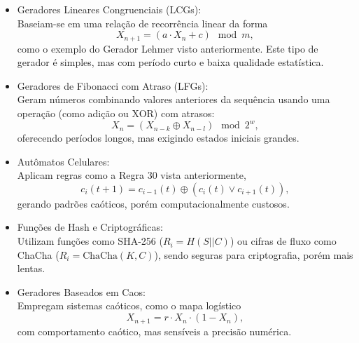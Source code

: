 \begin{itemize}
    \item Geradores Lineares Congruenciais (LCGs): \\
	Baseiam-se em uma relação de recorrência linear da forma 
	\begin{equation}
	    X_{n+1} = (a \cdot X_n + c) \mod m ,
	\end{equation} 
	como o exemplo do Gerador Lehmer visto anteriormente.
	Este tipo de gerador é simples, mas com período curto e baixa qualidade estatística.
    \item Geradores de Fibonacci com Atraso (LFGs): \\
	Geram números combinando valores anteriores da sequência usando uma operação (como adição ou XOR) com atrasos:
	\begin{equation}
	    X_n = (X_{n-k} \oplus X_{n-l}) \mod 2^w ,
	\end{equation} 
	oferecendo períodos longos, mas exigindo estados iniciais grandes.
    \item Autômatos Celulares: \\ 
	Aplicam regras como a Regra 30 vista anteriormente, 
	\begin{equation} 
	    c_i(t+1) = c_{i-1}(t) \oplus (c_i(t) \lor c_{i+1}(t)) ,
	\end{equation} 
	gerando padrões caóticos, porém computacionalmente custosos.
    \item Funções de Hash e Criptográficas: \\
	Utilizam funções como SHA-256 ($R_i = H(S || C)$) ou cifras de fluxo como ChaCha ($R_i = \text{ChaCha}(K, C)$), 
	sendo seguras para criptografia, porém mais lentas.
    \item Geradores Baseados em Caos: \\
	Empregam sistemas caóticos, como o mapa logístico 
	\begin{equation}
	    X_{n+1} = r \cdot X_n \cdot (1 - X_n) ,
	\end{equation}
	com comportamento caótico, mas sensíveis a precisão numérica.
\end{itemize}

